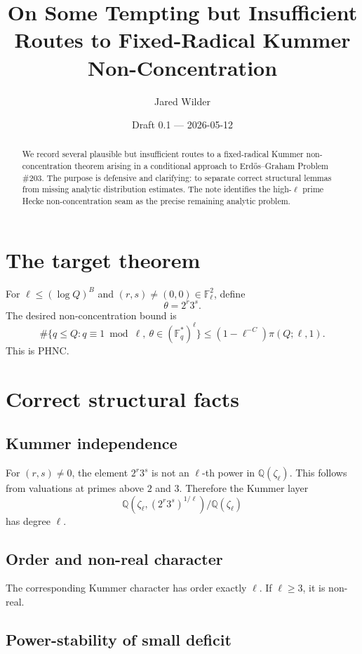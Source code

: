 \documentclass[11pt]{article}
\title{On Some Tempting but Insufficient Routes to Fixed-Radical Kummer Non-Concentration}
\author{Jared Wilder}
\date{Draft 0.1 --- 2026-05-12}
\newcommand{\Q}{\mathbb Q}
\newcommand{\F}{\mathbb F}
\newcommand{\1}{\mathbf 1}
\begin{document}
\maketitle

\begin{abstract}
We record several plausible but insufficient routes to a fixed-radical Kummer non-concentration theorem arising in a conditional approach to Erd\H{o}s--Graham Problem \#203.  The purpose is defensive and clarifying: to separate correct structural lemmas from missing analytic distribution estimates.  The note identifies the high-\(\ell\) prime Hecke non-concentration seam as the precise remaining analytic problem.
\end{abstract}

\section{The target theorem}

For \(\ell\le(\log Q)^B\) and \((r,s)\ne(0,0)\in\F_\ell^2\), define
\[
\theta=2^r3^s.
\]
The desired non-concentration bound is
\[
\#\{q\le Q:q\equiv1\bmod\ell,\ \theta\in(\F_q^*)^\ell\}
\le
(1-\ell^{-C})\pi(Q;\ell,1).
\]
This is PHNC.

\section{Correct structural facts}

\subsection{Kummer independence}

For \((r,s)\ne0\), the element \(2^r3^s\) is not an \(\ell\)-th power in \(\Q(\zeta_\ell)\).  This follows from valuations at primes above \(2\) and \(3\).  Therefore the Kummer layer
\[
\Q(\zeta_\ell,(2^r3^s)^{1/\ell})/\Q(\zeta_\ell)
\]
has degree \(\ell\).

\subsection{Order and non-real character}

The corresponding Kummer character has order exactly \(\ell\).  If \(\ell\ge3\), it is non-real.

\subsection{Power-stability of small deficit}
\end{document}
